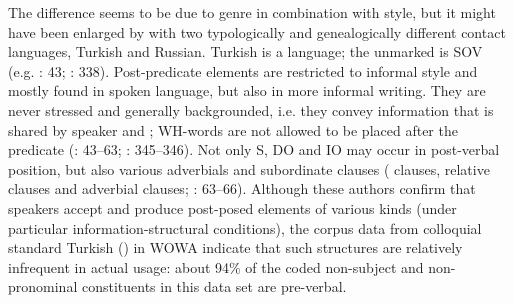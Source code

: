 \documentclass[output=paper,colorlinks,citecolor=brown, draft]{langscibook}
\begin{document}
The difference seems to be due to genre in combination with style, but it might have been enlarged by  with two typologically and genealogically different contact languages, Turkish and Russian. Turkish is a  language; the unmarked  is SOV (e.g. \citealt{erguvanli1984function}: 43; \citealt{goksel2005turkish}: 338). Post-predicate elements are restricted to informal style and mostly found in spoken language, but also in more informal writing. They are never stressed and generally backgrounded, i.e. they convey information that is shared by speaker and ; WH-words are not allowed to be placed after the predicate (\citealt{erguvanli1984function}: 43--63; \citealt{goksel2005turkish}: 345--346). Not only S, DO and IO may occur in post-verbal position, but also various adverbials and subordinate clauses ( clauses, relative clauses and adverbial clauses; \citealt{erguvanli1984function}: 63--66). Although these authors confirm that speakers accept and produce post-posed elements of various kinds (under particular information-structural conditions), the corpus data from colloquial standard Turkish (\citealt{Iefremenko2021}) in WOWA indicate that such structures are relatively infrequent in actual usage: about 94\% of the coded non-subject and non-pronominal constituents in this data set are pre-verbal.
\end{document}
